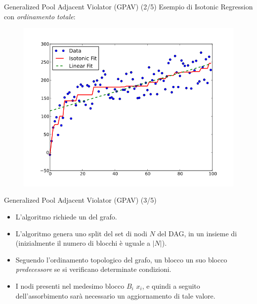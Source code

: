 \documentclass[9pt]{beamer}
\begin{document}
\begin{tframe}{Generalized Pool Adjacent Violator (GPAV) (2/5)}
Esempio di Isotonic Regression con \emph{ordinamento totale}:
\begin{figure}
\centering
\includegraphics[scale=0.3]{img/monotonic.png}
\end{figure}
\end{tframe}
\begin{tframe}{Generalized Pool Adjacent Violator (GPAV) (3/5)}
\begin{itemize}
\item L'algoritmo richiede un  del grafo.
\item L’algoritmo genera uno split del set di nodi $N$ del DAG, in un insieme di  (inizialmente il numero di blocchi è uguale a $|N|$).
\item Seguendo l'ordinamento topologico del grafo, un blocco  un suo blocco \emph{predecessore} se si verificano determinate condizioni.
\item I nodi presenti nel medesimo blocco $B_i$  $x_i$, e quindi a seguito dell'assorbimento sarà necessario un aggiornamento di tale valore.
\end{itemize}
\end{tframe}
\end{document}
